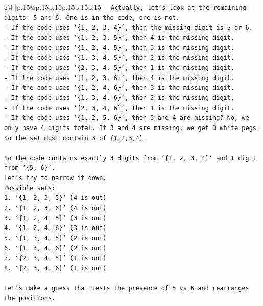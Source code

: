 \documentclass{article}
\begin{document}
{\begin{supertabular}{c@{$\;$}|p{.15\linewidth}@{}p{.15\linewidth}p{.15\linewidth}p{.15\linewidth}p{.15\linewidth}p{.15\linewidth}}
{{{\texttt{{-} Actually, let's look at the remaining digits: 5 and 6. One is in the code, one is not.} \\
\texttt{{-} If the code uses `\{1, 2, 3, 4\}`, then the missing digit is 5 or 6.} \\
\texttt{{-} If the code uses `\{1, 2, 3, 5\}`, then 4 is the missing digit.} \\
\texttt{{-} If the code uses `\{1, 2, 4, 5\}`, then 3 is the missing digit.} \\
\texttt{{-} If the code uses `\{1, 3, 4, 5\}`, then 2 is the missing digit.} \\
\texttt{{-} If the code uses `\{2, 3, 4, 5\}`, then 1 is the missing digit.} \\
\texttt{{-} If the code uses `\{1, 2, 3, 6\}`, then 4 is the missing digit.} \\
\texttt{{-} If the code uses `\{1, 2, 4, 6\}`, then 3 is the missing digit.} \\
\texttt{{-} If the code uses `\{1, 3, 4, 6\}`, then 2 is the missing digit.} \\
\texttt{{-} If the code uses `\{2, 3, 4, 6\}`, then 1 is the missing digit.} \\
\texttt{{-} If the code uses `\{1, 2, 5, 6\}`, then 3 and 4 are missing? No, we only have 4 digits total. If 3 and 4 are missing, we get 0 white pegs. So the set must contain 3 of \{1,2,3,4\}.} \\
\\ 
\texttt{So the code contains exactly 3 digits from `\{1, 2, 3, 4\}` and 1 digit from `\{5, 6\}`.} \\
\texttt{Let's try to narrow it down.} \\
\texttt{Possible sets:} \\
\texttt{1. `\{1, 2, 3, 5\}` (4 is out)} \\
\texttt{2. `\{1, 2, 3, 6\}` (4 is out)} \\
\texttt{3. `\{1, 2, 4, 5\}` (3 is out)} \\
\texttt{4. `\{1, 2, 4, 6\}` (3 is out)} \\
\texttt{5. `\{1, 3, 4, 5\}` (2 is out)} \\
\texttt{6. `\{1, 3, 4, 6\}` (2 is out)} \\
\texttt{7. `\{2, 3, 4, 5\}` (1 is out)} \\
\texttt{8. `\{2, 3, 4, 6\}` (1 is out)} \\
\\ 
\texttt{Let's make a guess that tests the presence of 5 vs 6 and rearranges the positions.} \\
}}}
\end{supertabular}}
\end{document}
